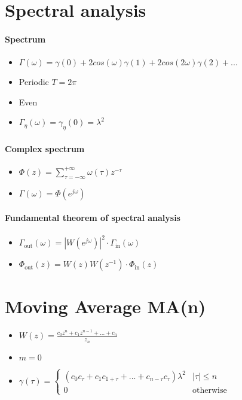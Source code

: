 \documentclass{article}
\begin{document}
\section{Spectral analysis}
\paragraph{Spectrum}
\begin{itemize}
\item $\Gamma(\omega)=\gamma(0)+2cos(\omega)\gamma(1)+2cos(2\omega)\gamma(2)+...$
\item Periodic $T=2\pi$
\item Even
\item $\Gamma_\eta(\omega)=\gamma_\eta(0)=\lambda^2$
\end{itemize}
\paragraph{Complex spectrum}
\begin{itemize}
\item $\Phi(z)=\sum_{\tau =-\infty}^{+\infty} \omega(\tau)z^{-\tau}$
\item $\Gamma(\omega)=\Phi(e^{j\omega})$
\end{itemize}
\paragraph{Fundamental theorem of spectral analysis}
\begin{itemize}
\item $\Gamma_{\text{out}}(\omega)=|W(e^{j\omega})|^2 \cdot \Gamma_{\text{in}}(\omega)$
\item $\Phi_{\text{out}}(z)=W(z)W(z^{-1}) \cdot \Phi_{\text{in}}(z)$
\end{itemize}
\section{Moving Average MA(n)}
\begin{itemize}
\item $W(z)=\frac{c_0z^n+c_1z^{n-1}+...+c_n}{z_n}$
\item $m=0$
\item $\gamma(\tau)= 
\begin{cases}
(c_0c_\tau+c_1c_{1+\tau}+...+c_{n-\tau}c_\tau)\lambda^2	&	|\tau|\leq n\\
0	& \text{otherwise}
\end{cases}$
\end{itemize}
\end{document}

